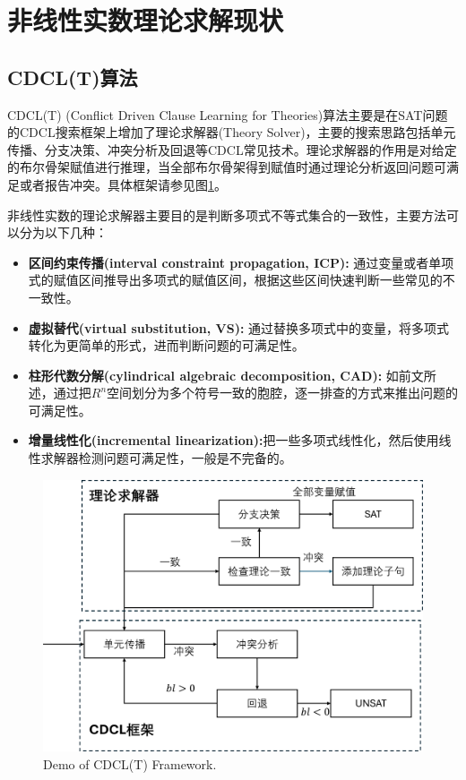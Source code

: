\section{非线性实数理论求解现状}
\subsection{CDCL(T)算法}
CDCL(T) (Conflict Driven Clause Learning for Theories)算法主要是在SAT问题的CDCL搜索框架上增加了理论求解器(Theory Solver)，主要的搜索思路包括单元传播、分支决策、冲突分析及回退等CDCL常见技术。理论求解器的作用是对给定的布尔骨架赋值进行推理，当全部布尔骨架得到赋值时通过理论分析返回问题可满足或者报告冲突。具体框架请参见图\ref{fig:cdclt}。

非线性实数的理论求解器主要目的是判断多项式不等式集合的一致性，主要方法可以分为以下几种：
\begin{itemize}
    \item \textbf{区间约束传播(interval constraint propagation, ICP):} 通过变量或者单项式的赋值区间推导出多项式的赋值区间，根据这些区间快速判断一些常见的不一致性。
    \item \textbf{虚拟替代(virtual substitution, VS):} 通过替换多项式中的变量，将多项式转化为更简单的形式，进而判断问题的可满足性。
    \item \textbf{柱形代数分解(cylindrical algebraic decomposition, CAD):} 如前文所述，通过把$R^n$空间划分为多个符号一致的胞腔，逐一排查的方式来推出问题的可满足性。
    \item \textbf{增量线性化(incremental linearization):}把一些多项式线性化，然后使用线性求解器检测问题可满足性，一般是不完备的。
\end{itemize}

\begin{figure}[t]
    \centering
    \includegraphics[width=\columnwidth]{Img/cdcl_t.png}
     {Demo of CDCL(T) Framework.}
    \label{fig:cdclt}
\end{figure}

